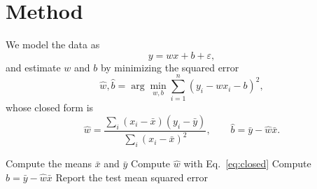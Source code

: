 \section{Method}
\label{sec:method}
We model the data as
\begin{equation}
  y = w x + b + \varepsilon,
  \label{eq:model}
\end{equation}
and estimate $w$ and $b$ by minimizing the squared error
\begin{equation}
  \hat{w}, \hat{b} = \arg\min_{w, b} \sum_{i=1}^{n} (y_i - w x_i - b)^2,
  \label{eq:ols}
\end{equation}
whose closed form is
\begin{equation}
  \hat{w} = \frac{\sum_i (x_i - \bar{x})(y_i - \bar{y})}{\sum_i (x_i - \bar{x})^2},
  \qquad \hat{b} = \bar{y} - \hat{w}\bar{x}.
  \label{eq:closed}
\end{equation}

\begin{algorithm}[t]
\caption{Least squares fit}
\label{alg:fit}
\begin{algorithmic}
\STATE Compute the means $\bar{x}$ and $\bar{y}$
\STATE Compute $\hat{w}$ with Eq.~\ref{eq:closed}
\STATE Compute $\hat{b} = \bar{y} - \hat{w}\bar{x}$
\STATE Report the test mean squared error
\end{algorithmic}
\end{algorithm}
